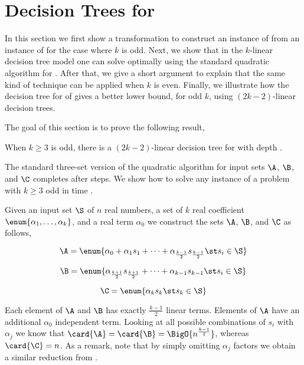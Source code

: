 \section{Decision Trees for \kLDT}
\label{tree:3sum:kldt}

In this section we first show a transformation to construct an instance
of \threeSUM from an instance of \kLDT for the case where \(k\) is odd. Next, we
show that in the \(k\)-linear decision tree model one can solve \kLDT optimally
using the standard quadratic algorithm for \threeSUM. After that, we give a
short argument to explain that the same kind of technique can be applied when
\(k\) is even. Finally, we illustrate how the decision tree for \threeSUM of
\citet*{gronlund:2014} gives a better lower bound, for odd \(k\), using
\((2k-2)\)-linear decision trees.

The goal of this section is to prove the following result,

\begin{theorem}
When $k \ge 3$ is odd, there is a $(2k-2)$-linear decision tree for \kLDT with
depth .
\end{theorem}

The standard three-set version of the quadratic \threeSUM algorithm for input
sets \(\A\), \(\B\), and \(\C\) completes after \BigO{\card{\C} ( \card{\A} +
\card{\B} ) } steps. We show how to solve any instance of a \kLDT problem
with \(k \ge 3\) odd in time .

Given an input set \(\S\) of \(n\) real numbers, a set of \(k\) real
coefficient \( \enum{\alpha_1,\ldots,\alpha_k}\), and a real term \(\alpha_0\)
we construct the sets \(\A\), \(\B\), and \(\C\) as follows,

\begin{displaymath}
\A = \enum{\alpha_0 + \alpha_1 s_1 + \cdots + \alpha_{\frac{k-1}{2}} s_{\frac{k-1}{2}} \st s_i \in \S}
\end{displaymath}

\begin{displaymath}
\B = \enum{\alpha_{\frac{k+1}{2}} s_{\frac{k+1}{2}} + \cdots + \alpha_{k-1} s_{k-1} \st s_i \in \S}
\end{displaymath}

\begin{displaymath}
\C = \enum{\alpha_k s_k \st s_k \in \S}
\end{displaymath}

Each element of \(\A\) and \(\B\) has exactly \(\frac{k-1}{2}\) linear terms.
Elements of \(\A\) have an additional \(\alpha_0\) independent term. Looking
at all possible combinations of \(s_i\) with \(\alpha_j\) we know that
\(\card{\A} = \card{\B} = \BigO{n^{\frac{k-1}{2}}}\), whereas \(\card{\C} =
n\). As a remark, note that by simply omitting \(\alpha_j\) factors we obtain a
similar reduction from \kSUM.

